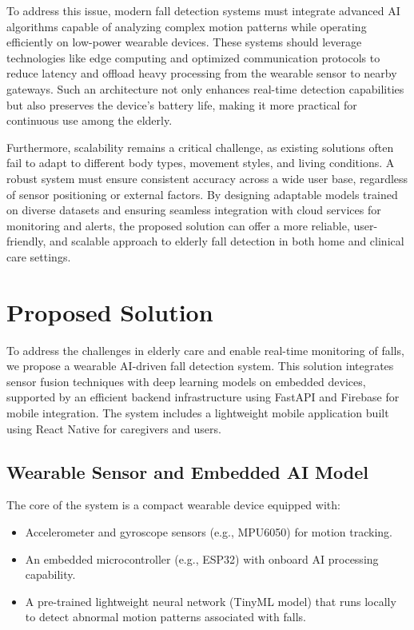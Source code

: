\documentclass[a4paper, 12pt]{report}
\begin{document}
To address this issue, modern fall detection systems must integrate advanced AI algorithms capable of analyzing complex motion patterns while operating efficiently on low-power wearable devices. These systems should leverage technologies like edge computing and optimized communication protocols to reduce latency and offload heavy processing from the wearable sensor to nearby gateways. Such an architecture not only enhances real-time detection capabilities but also preserves the device’s battery life, making it more practical for continuous use among the elderly.

Furthermore, scalability remains a critical challenge, as existing solutions often fail to adapt to different body types, movement styles, and living conditions. A robust system must ensure consistent accuracy across a wide user base, regardless of sensor positioning or external factors. By designing adaptable models trained on diverse datasets and ensuring seamless integration with cloud services for monitoring and alerts, the proposed solution can offer a more reliable, user-friendly, and scalable approach to elderly fall detection in both home and clinical care settings.

\section{Proposed Solution}


To address the challenges in elderly care and enable real-time monitoring of falls, we propose a wearable AI-driven fall detection system. This solution integrates sensor fusion techniques with deep learning models on embedded devices, supported by an efficient backend infrastructure using FastAPI and Firebase for mobile integration. The system includes a lightweight mobile application built using React Native for caregivers and users.
\subsection{Wearable Sensor and Embedded AI Model}
The core of the system is a compact wearable device equipped with:
\begin{itemize}[itemsep=-4pt]
    \item Accelerometer and gyroscope sensors (e.g., MPU6050) for motion tracking.
    \item An embedded microcontroller (e.g., ESP32) with onboard AI processing capability.
    \item A pre-trained lightweight neural network (TinyML model) that runs locally to detect abnormal motion patterns associated with falls.
\end{itemize}
\end{document}
